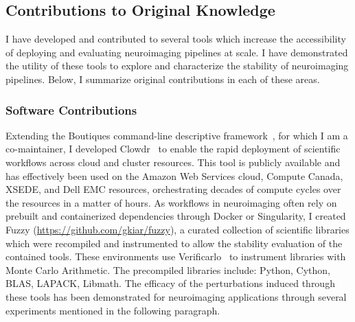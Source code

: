\subsection{Contributions to Original Knowledge}
I have developed and contributed to several tools which increase the accessibility of deploying and evaluating
neuroimaging pipelines at scale. I have demonstrated the utility of these tools to explore and characterize the
stability of neuroimaging pipelines. Below, I summarize original contributions in each of these areas.

\subsubsection*{Software Contributions}
Extending the Boutiques command-line descriptive framework~\cite{Glatard2018-tu}, for which I am a co-maintainer, I
developed Clowdr~\cite{Kiar2019-sr} to enable the rapid deployment of scientific workflows across cloud and cluster
resources. This tool is publicly available and has effectively been used on the Amazon Web Services cloud, Compute
Canada, XSEDE, and Dell  EMC resources, orchestrating decades of compute cycles over the resources in a matter of
hours. As workflows in neuroimaging often rely on prebuilt and containerized dependencies through Docker or
Singularity, I created Fuzzy (\href{https://github.com/gkiar/fuzzy}{https://github.com/gkiar/fuzzy}), a curated
collection of scientific libraries which were recompiled and instrumented to allow the stability evaluation of the
contained tools. These environments use Verificarlo~\cite{Denis2016-wo} to instrument libraries with Monte Carlo
Arithmetic. The precompiled libraries include: Python, Cython, BLAS, LAPACK, Libmath. The efficacy of the perturbations
induced through these tools has been demonstrated for neuroimaging applications through several experiments mentioned
in the following paragraph.

